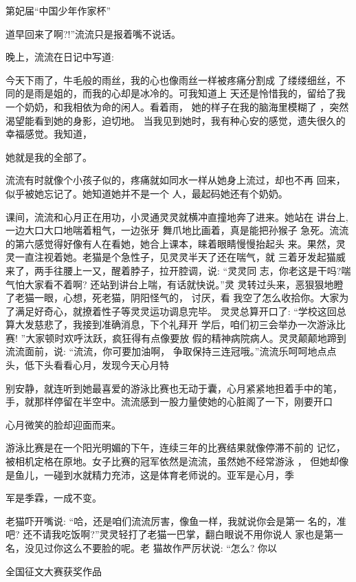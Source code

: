 \documentclass{article}
\begin{document}
第妃届“中国少年作家杯” 

道早回来了啊?!”流流只是报着嘴不说话。

\newpage

晚上，流流在日记中写道: 

今天下雨了，牛毛般的雨丝，我的心也像雨丝一样被疼痛分割成
了缕缕细丝，不同的是雨是姐的，而我的心却是冰冷的。可我知道上
天还是怜惜我的，留给了我一个奶奶，和我相依为命的闲人。看着雨，
她的样子在我的脑海里模糊了 ，突然渴望能看到她的身影，迫切地。
当我见到她时，我有种心安的感觉，遗失很久的幸福感觉。我知道，

她就是我的全部了。 

流流有时就像个小孩子似的，疼痛就如同水一样从她身上流过，却也不再
回来，似乎被她忘记了。她知道她并不是一个
人，最起码她还有个奶奶。 

课间，流流和心月正在用功，小灵通灵灵就横冲直撞地奔了进来。她站在
讲台上,一边大口大口地喘着粗气，一边张牙
\newpage
舞爪地比画着，真是能把孙猴子
急死。流流的第六感觉得好像有人在看她，她合上课本，睐着眼睛慢慢抬起头
来。果然，灵灵一直注视着她。老猫是个急性子，见灵灵半天了还在喘气，就
三着牙发起猫威来了，两手往腰上一又，醒着脖子，拉开腔调，说: “灵灵同
志，你老这是干吗?喘气怕大家看不着啊? 还站到讲台上喘，有话就快说。”灵
灵转过头来，恶狠狠地瞪了老猫一眼，心想，死老猫，阴阳怪气的， 讨厌，看
我空了怎么收拾你。大家为了满足好奇心，就撩着性子等灵灵运功调息完毕。
灵灵总算开口了: “学校这回总算大发慈悲了，我接到准确消息，下个礼拜开
学后，咱们初三会举办一次游泳比赛! ”大家顿时欢呼汰跃，疯狂得有点像要放
假的精神病院病人。灵灵颠颠地蹄到流流面前，说: “流流，你可要加油啊，
争取保持三连冠哦。”流流乐呵呵地点点头，低下头看看心月，发现今天心月特
\newpage

别安静，就连听到她最喜爱的游泳比赛也无动于囊，心月紧紧地担着手中的笔，
手，就那样停留在半空中。流流感到一股力量使她的心脏阁了一下，刚要开口

心月微笑的脸却迎面而来。 

游泳比赛是在一个阳光明媚的下午，连续三年的比赛结果就像停滞不前的
记忆，被相机定格在原地。女子比赛的冠军依然是流流，虽然她不经常游泳 ，
但她却像是鱼儿，一碰到水就精力充沛，这是体育老师说的。亚军是心月，季

军是季霖，一成不变。 

老猫吓开嘴说: “哈，还是咱们流流厉害，像鱼一样，我就说你会是第一
名的，准吧? 还不请我吃饭啊?”灵灵轻打了老猫一巴掌，翻白眼说不用你说人
家也是第一名，没见过你这么不要脸的呢。老
猫故作严厉状说: “怎么? 你以 

\newpage


全国征文大赛获奖作品 
\end{document}
